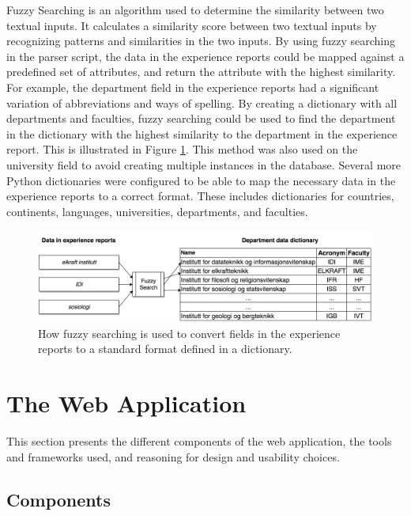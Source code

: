 Fuzzy Searching is an algorithm used to determine the similarity between two textual inputs. It calculates a similarity score between two textual inputs by recognizing patterns and similarities in the two inputs. By using fuzzy searching in the parser script, the data in the experience reports could be mapped against a predefined set of attributes, and return the attribute with the highest similarity. For example, the department field in the experience reports had a significant variation of abbreviations and ways of spelling. By creating a dictionary with all departments and faculties, fuzzy searching could be used to find the department in the dictionary with the highest similarity to the department in the experience report. This is illustrated in Figure \ref{fig:fuzzy_searching}. This method was also used on the university field to avoid creating multiple instances in the database. Several more Python dictionaries were configured to be able to map the necessary data in the experience reports to a correct format. These includes dictionaries for countries, continents, languages, universities, departments, and faculties.

\begin{figure}[h]
    \centering
    \includegraphics[width=1.0\textwidth]{fig/fuzzy_search2.png}
    \caption[Fuzzy searching]{How fuzzy searching is used to convert fields in the experience reports to a standard format defined in a dictionary.}
    \label{fig:fuzzy_searching}
\end{figure}

\FloatBarrier

\section{The Web Application}

This section presents the different components of the web application, the tools and frameworks used, and reasoning for design and usability choices.

\subsection{Components}

